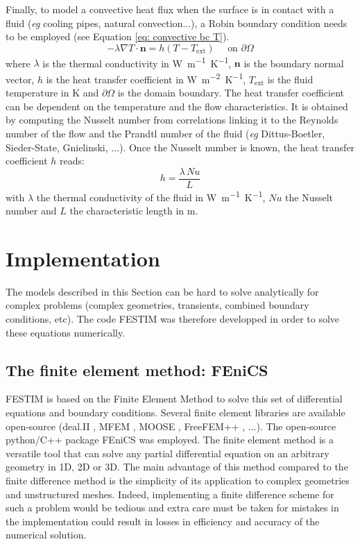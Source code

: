 Finally, to model a convective heat flux when the surface is in contact with a fluid (\textit{eg} cooling pipes, natural convection...), a Robin boundary condition needs to be employed (see Equation \ref{eq: convective bc T}).
\begin{equation}
    -\lambda \nabla T \cdot \mathbf{n} = h (T - T_\mathrm{ext}) \quad \text { on } \partial \Omega
    \label{eq: convective bc T}
\end{equation}
where $\lambda$ is the thermal conductivity in \si{W.m^{-1}.K^{-1}}, $\mathbf{n}$ is the boundary normal vector, $h$ is the heat transfer coefficient in \si{W.m^{-2}.K^{-1}}, $T_\mathrm{ext}$ is the fluid temperature in \si{K} and $\partial \Omega$ is the domain boundary.
The heat transfer coefficient can be dependent on the temperature and the flow characteristics.
It is obtained by computing the Nusselt number from correlations linking it to the Reynolds number of the flow and the Prandtl number of the fluid  (\textit{eg} Dittus-Boetler, Sieder-State, Gnielinski, ...).
Once the Nusselt number is known, the heat transfer coefficient $h$ reads:
\begin{equation}
    h = \frac{\lambda \, \textit{Nu}}{L}
\end{equation}
with $\lambda$ the thermal conductivity of the fluid in \si{W.m^{-1}.K^{-1}}, $\textit{Nu}$ the Nusselt number and $L$ the characteristic length in \si{m}.


\section{Implementation}


The models described in this Section can be hard to solve analytically for complex problems (complex geometries, transients, combined boundary conditions, etc).
The code FESTIM  was therefore developped in order to solve these equations numerically.

\subsection{The finite element method: FEniCS}
FESTIM is based on the Finite Element Method to solve this set of differential equations and boundary conditions.
Several finite element libraries are available open-source (deal.II , MFEM , MOOSE , FreeFEM++ , ...).
The open-source python/C++ package FEniCS  was employed.
The finite element method is a versatile tool that can solve any partial differential equation on an arbitrary geometry in 1D, 2D or 3D.
The main advantage of this method compared to the finite difference method is the simplicity of its application to complex geometries and unstructured meshes.
Indeed, implementing a finite difference scheme for such a problem would be tedious and extra care must be taken for mistakes in the implementation could result in losses in efficiency and accuracy of the numerical solution.

